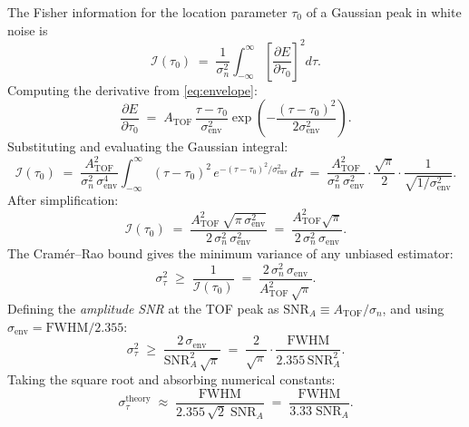 \documentclass[11pt]{article}
\begin{document}
The Fisher information for the location parameter $\tau_0$ of a Gaussian peak
in white noise is
\begin{equation}
  \mathcal{I}(\tau_0)
    \;=\; \frac{1}{\sigma_n^2}\int_{-\infty}^{\infty}
          \left[\frac{\partial E}{\partial \tau_0}\right]^2 d\tau.
\end{equation}
Computing the derivative from \eqref{eq:envelope}:
\begin{equation}
  \frac{\partial E}{\partial \tau_0}
    \;=\; A_\mathrm{TOF}\,\frac{\tau - \tau_0}{\sigma_\mathrm{env}^2}
          \exp\!\left(-\frac{(\tau-\tau_0)^2}{2\sigma_\mathrm{env}^2}\right).
\end{equation}
Substituting and evaluating the Gaussian integral:
\begin{equation}
  \mathcal{I}(\tau_0)
    \;=\; \frac{A_\mathrm{TOF}^2}{\sigma_n^2\,\sigma_\mathrm{env}^4}
          \int_{-\infty}^{\infty}
          (\tau-\tau_0)^2\,
          e^{-(\tau-\tau_0)^2/\sigma_\mathrm{env}^2}\,d\tau
    \;=\; \frac{A_\mathrm{TOF}^2}{\sigma_n^2\,\sigma_\mathrm{env}^2}
          \cdot\frac{\sqrt{\pi}}{2}\cdot\frac{1}{\sqrt{1/\sigma_\mathrm{env}^2}}.
\end{equation}
After simplification:
\begin{equation}
  \mathcal{I}(\tau_0)
    \;=\; \frac{A_\mathrm{TOF}^2\,\sqrt{\pi\,\sigma_\mathrm{env}^2}}
               {2\,\sigma_n^2\,\sigma_\mathrm{env}^2}
    \;=\; \frac{A_\mathrm{TOF}^2\sqrt{\pi}}{2\,\sigma_n^2\,\sigma_\mathrm{env}}.
\end{equation}
The Cramér--Rao bound gives the minimum variance of any unbiased estimator:
\begin{equation}
  \sigma_\tau^2 \;\geq\; \frac{1}{\mathcal{I}(\tau_0)}
    \;=\; \frac{2\,\sigma_n^2\,\sigma_\mathrm{env}}{A_\mathrm{TOF}^2\,\sqrt{\pi}}.
\end{equation}
Defining the \emph{amplitude SNR} at the TOF peak as
$\mathrm{SNR}_A \equiv A_\mathrm{TOF}/\sigma_n$, and using
$\sigma_\mathrm{env} = \mathrm{FWHM}/2.355$:
\begin{equation}
  \sigma_\tau^2 \;\geq\;
    \frac{2\,\sigma_\mathrm{env}}{\mathrm{SNR}_A^2\,\sqrt{\pi}}
    \;=\;
    \frac{2}{\sqrt{\pi}}\cdot\frac{\mathrm{FWHM}}{2.355\,\mathrm{SNR}_A^2}.
\end{equation}
Taking the square root and absorbing numerical constants:
\begin{equation}
  \boxed{
    \sigma_\tau^{\mathrm{theory}}
      \;\approx\;
      \frac{\mathrm{FWHM}}{2.355\,\sqrt{2}\;\mathrm{SNR}_A}
      \;=\;
      \frac{\mathrm{FWHM}}{3.33\;\mathrm{SNR}_A}.
  }
  \label{eq:main}
\end{equation}
\end{document}
